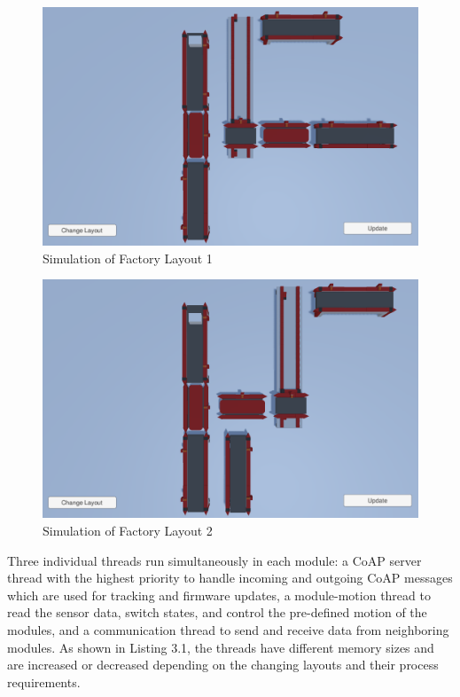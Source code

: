 \begin{figure}
    \centering
    \includegraphics[scale=0.33]{images/Layout1.png}
    \caption{Simulation of Factory Layout 1}
    \label{fig:layout1}
\end{figure}

\begin{figure}
    \centering
    \includegraphics[scale=0.33]{images/Layout2.png}
    \caption{Simulation of Factory Layout 2}
    \label{fig:layout2}
\end{figure}

Three individual threads run simultaneously in each module: a \acrshort{CoAP} server thread with the highest priority to handle incoming and outgoing \acrshort{CoAP} messages which are used for tracking and firmware updates, a module-motion thread to read the sensor data, switch states, and control the pre-defined motion of the modules, and a communication thread to send and receive data from neighboring modules. As shown in Listing 3.1, the threads have different memory sizes and are increased or decreased depending on the changing layouts and their process requirements.

